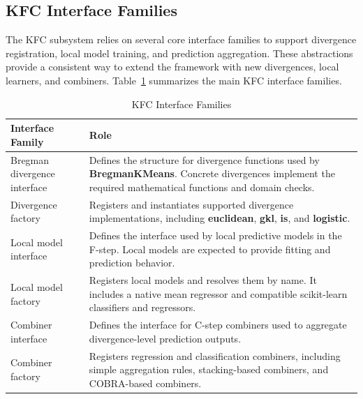 \subsection{KFC Interface Families}

\hs The KFC subsystem relies on several core interface families to support divergence registration, local model training, and prediction aggregation. These abstractions provide a consistent way to extend the framework with new divergences, local learners, and combiners. Table~\ref{tab:kfc_interface_families} summarizes the main KFC interface families.

\begin{table}[H]
      \centering
      \caption{KFC Interface Families}
      \label{tab:kfc_interface_families}
      \renewcommand{\arraystretch}{1.2}
      \begin{tabularx}{\textwidth}{
                  >{\raggedright\arraybackslash}p{3.8cm}
                  >{\raggedright\arraybackslash}X
            }
            \toprule
            \textbf{Interface Family}    & \textbf{Role}                                                                                                                         \\
            \midrule
            Bregman divergence interface &
            Defines the structure for divergence functions used by \textbf{BregmanKMeans}. Concrete divergences implement the required mathematical functions and domain checks. \\

            Divergence factory           &
            Registers and instantiates supported divergence implementations, including \textbf{euclidean}, \textbf{gkl}, \textbf{is}, and \textbf{logistic}.                     \\

            Local model interface        &
            Defines the interface used by local predictive models in the F-step. Local models are expected to provide fitting and prediction behavior.                           \\

            Local model factory          &
            Registers local models and resolves them by name. It includes a native mean regressor and compatible scikit-learn classifiers and regressors.                        \\

            Combiner interface           &
            Defines the interface for C-step combiners used to aggregate divergence-level prediction outputs.                                                                    \\

            Combiner factory             &
            Registers regression and classification combiners, including simple aggregation rules, stacking-based combiners, and COBRA-based combiners.                          \\
            \bottomrule
      \end{tabularx}
\end{table}

